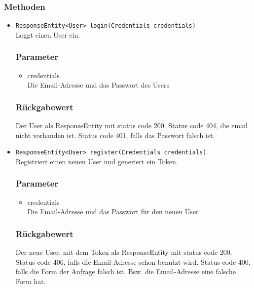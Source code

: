 \documentclass[a4paper]{scrreprt}
\begin{document}
\subsubsection*{Methoden}
\begin{addmargin}[25pt]{0pt}
\begin{itemize}

\item \texttt{ResponseEntity<User> login(Credentials credentials)}\\
	Loggt einen User ein.

	\subsubsection*{Parameter}
	\begin{itemize}
	\item credentials \\
		Die Email-Adresse und das Passwort des Users
	\end{itemize}

	\subsubsection*{Rückgabewert}
	Der User als ResponseEntity mit status code 200.
	Status code 404, die email nicht vorhanden ist.
	Status code 401, falls das Passwort falsch ist.

\item \texttt{ResponseEntity<User> register(Credentials credentials)}\\
	Registriert einen neuen User und generiert ein Token.

	\subsubsection*{Parameter}
	\begin{itemize}
	\item credentials \\
		Die Email-Adresse und das Passwort für den neuen User

	\end{itemize}

	\subsubsection*{Rückgabewert}
	Der neue User, mit dem Token als ResponseEntity mit status code 200.
	Status code 406, falls die Email-Adresse schon benutzt wird.
	Status code 400, falls die Form der Anfrage falsch ist. Bsw. die Email-Adresse eine falsche Form hat.
		

\end{itemize}
\end{addmargin}
\end{document}
